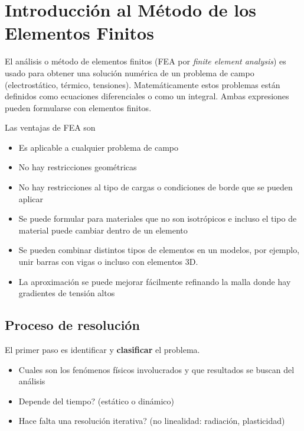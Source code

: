 \documentclass[11pt, a4paper,titlepage]{article}
\begin{document}
\pagestyle{plain}
\setcounter{page}{1}
\setcounter{section}{-1}
\section{Introducción al Método de los Elementos Finitos}
El análisis o método de elementos finitos (FEA por \textit{finite element analysis}) es usado para obtener una solución numérica de un problema de campo (electrostático, térmico, tensiones). Matemáticamente estos problemas están definidos como ecuaciones diferenciales o como un integral. Ambas expresiones pueden formularse con elementos finitos.

Las ventajas de FEA son
\vspace{-.3cm}
\begin{itemize}
	\item Es aplicable a cualquier problema de campo
	\item No hay restricciones geométricas
	\item No hay restricciones al tipo de cargas o condiciones de borde que se pueden aplicar
	\item Se puede formular para materiales que no son isotrópicos e incluso el tipo de material puede cambiar dentro de un elemento
	\item Se pueden combinar distintos tipos de elementos en un modelos, por ejemplo, unir barras con vigas o incluso con elementos 3D.
	\item La aproximación se puede mejorar fácilmente refinando la malla donde hay gradientes de tensión altos
\end{itemize}
\vspace{-.7cm}
\subsection*{Proceso de resolución}
El primer paso es identificar y \textbf{clasificar} el problema.
\begin{itemize}
	\item Cuales son los fenómenos físicos involucrados y que resultados se buscan del análisis
	\item Depende del tiempo? (estático o dinámico)
	\item Hace falta una resolución iterativa? (no linealidad: radiación, plasticidad)
\end{itemize} 
\end{document}
